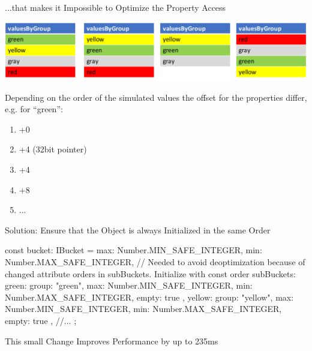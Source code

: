 \begin{frame}{...that makes it Impossible to Optimize the Property Access}
	\begin{center}
		\includegraphics[width=1\textwidth]{memory-model}
	\end{center}
	
	Depending on the order of the simulated values the offset for the properties differ, e.g. for \enquote{green}:
	
	\begin{enumerate}[<+->]
		\item +0
		\item +4 (32bit pointer)
		\item +4
		\item +8
		\item ...
	\end{enumerate}
	
\end{frame}

\begin{frame}{Solution: Ensure that the Object is always Initialized in the same Order}
	\begin{javascriptcode}
const bucket: IBucket = {
	max: Number.MIN_SAFE_INTEGER,
	min: Number.MAX_SAFE_INTEGER,
	// Needed to avoid deoptimization because of changed attribute orders in subBuckets. Initialize with const order
	subBuckets: {
		green: {
			group: "green",
			max: Number.MIN_SAFE_INTEGER,
			min: Number.MAX_SAFE_INTEGER,
			empty: true
		},
		yellow: {
			group: "yellow",
			max: Number.MIN_SAFE_INTEGER,
			min: Number.MAX_SAFE_INTEGER,
			empty: true
		},
		//...
	}
};	
	\end{javascriptcode}
\end{frame}

\begin{frame}{This small Change Improves Performance by up to 235ms}
\end{frame}

